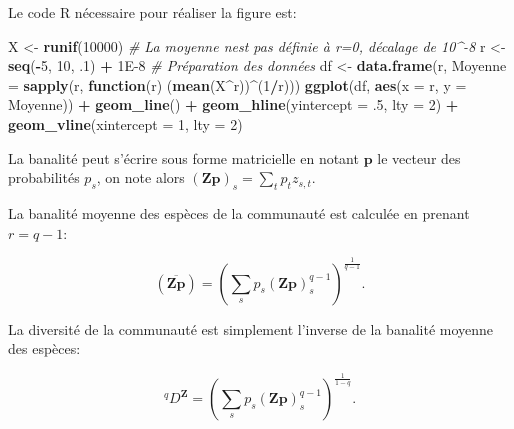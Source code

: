 \documentclass[
  11pt,
  french,
  a4paper,
  extrafontsizes,onecolumn,openright
  ]{memoir}
\newenvironment{Shaded}{\begin{snugshade}}{\end{snugshade}}
\newcommand{\AttributeTok}[1]{\textcolor[rgb]{0.13,0.29,0.53}{#1}}
\newcommand{\CommentTok}[1]{\textcolor[rgb]{0.56,0.35,0.01}{\textit{#1}}}
\newcommand{\ControlFlowTok}[1]{\textcolor[rgb]{0.13,0.29,0.53}{\textbf{#1}}}
\newcommand{\DecValTok}[1]{\textcolor[rgb]{0.00,0.00,0.81}{#1}}
\newcommand{\FloatTok}[1]{\textcolor[rgb]{0.00,0.00,0.81}{#1}}
\newcommand{\FunctionTok}[1]{\textcolor[rgb]{0.13,0.29,0.53}{\textbf{#1}}}
\newcommand{\NormalTok}[1]{#1}
\newcommand{\OtherTok}[1]{\textcolor[rgb]{0.56,0.35,0.01}{#1}}
\newcommand{\SpecialCharTok}[1]{\textcolor[rgb]{0.81,0.36,0.00}{\textbf{#1}}}
\begin{document}
Le code R nécessaire pour réaliser la figure est:

\scriptsize

\begin{Shaded}
\begin{Highlighting}[]
\NormalTok{X }\OtherTok{\textless{}{-}} \FunctionTok{runif}\NormalTok{(}\DecValTok{10000}\NormalTok{)}
\CommentTok{\# La moyenne n\textquotesingle{}est pas définie à r=0, décalage de 10\^{}{-}8}
\NormalTok{r }\OtherTok{\textless{}{-}} \FunctionTok{seq}\NormalTok{(}\SpecialCharTok{{-}}\DecValTok{5}\NormalTok{, }\DecValTok{10}\NormalTok{, .}\DecValTok{1}\NormalTok{) }\SpecialCharTok{+} \FloatTok{1E{-}8}
\CommentTok{\# Préparation des données}
\NormalTok{df }\OtherTok{\textless{}{-}} \FunctionTok{data.frame}\NormalTok{(r, }\AttributeTok{Moyenne =} \FunctionTok{sapply}\NormalTok{(r, }\ControlFlowTok{function}\NormalTok{(r) (}\FunctionTok{mean}\NormalTok{(X}\SpecialCharTok{\^{}}\NormalTok{r))}\SpecialCharTok{\^{}}\NormalTok{(}\DecValTok{1}\SpecialCharTok{/}\NormalTok{r)))}
\FunctionTok{ggplot}\NormalTok{(df, }\FunctionTok{aes}\NormalTok{(}\AttributeTok{x =}\NormalTok{ r, }\AttributeTok{y =}\NormalTok{ Moyenne)) }\SpecialCharTok{+}
  \FunctionTok{geom\_line}\NormalTok{() }\SpecialCharTok{+}
  \FunctionTok{geom\_hline}\NormalTok{(}\AttributeTok{yintercept =}\NormalTok{ .}\DecValTok{5}\NormalTok{, }\AttributeTok{lty =} \DecValTok{2}\NormalTok{) }\SpecialCharTok{+}
  \FunctionTok{geom\_vline}\NormalTok{(}\AttributeTok{xintercept =} \DecValTok{1}\NormalTok{, }\AttributeTok{lty =} \DecValTok{2}\NormalTok{)}
\end{Highlighting}
\end{Shaded}

\normalsize

La banalité peut s'écrire sous forme matricielle en notant \(\mathbf{p}\) le vecteur des probabilités \(p_s\), on note alors \({\left(\mathbf{Zp}\right)}_s=\sum_t{p_{t}z_{s,t}}\).

La banalité moyenne des espèces de la communauté est calculée en prenant \(r=q-1\):

\begin{equation}
  \label{eq:barZp}
  \left(\overline{{\mathbf{Zp}}}\right)
  = {\left(\sum_s{p_s{\left(\mathbf{Zp}\right)}^{q-1}_s}\right)}^{\frac{1}{q-1}}.
\end{equation}

La diversité de la communauté est simplement l'inverse de la banalité moyenne des espèces:

\begin{equation}
  \label{eq:Dqz}
  ^q\!D^{\mathbf{Z}}={\left(\sum_s{p_s{\left(\mathbf{Zp}\right)}^{q-1}_s}\right)}^{\frac{1}{1-q}}.
\end{equation}
\end{document}
